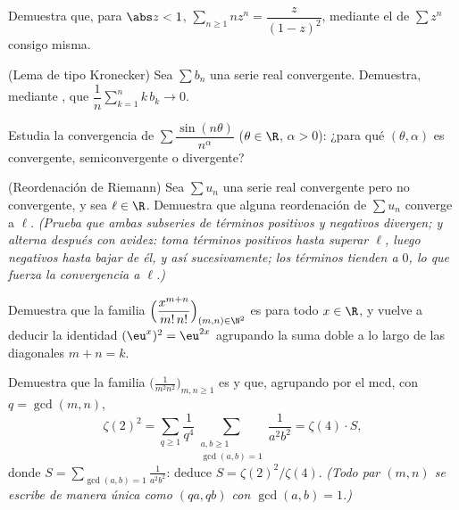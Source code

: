 \begin{exercise}[$\star$]\label{exo:b2:series:2}
Demuestra que, para $\abs z < 1$, $\sum_{n\geq1} n z^{n} =
\dfrac{z}{(1-z)^2}$, mediante el  de $\sum z^n$
consigo misma.
\end{exercise}

\begin{exercise}[$\star\star$]\label{exo:b2:series:3}
(Lema de tipo Kronecker) Sea $\sum b_n$ una serie real convergente.
Demuestra, mediante , que $\dfrac{1}{n}\sum_{k=1}^{n}
k\,b_k \to 0$.
\end{exercise}

\begin{exercise}[$\star\star$]\label{exo:b2:series:4}
Estudia la convergencia de $\sum \dfrac{\sin(n\theta)}{n^\alpha}$
($\theta \in \R$, $\alpha > 0$): ¿para qué $(\theta, \alpha)$ es
 convergente, semiconvergente o divergente?
\end{exercise}

\begin{exercise}[$\star\star\star$]\label{exo:b2:series:5}
(Reordenación de Riemann) Sea $\sum u_n$ una serie real convergente
pero no  convergente, y sea $\ell \in \R$. Demuestra que
alguna reordenación de $\sum u_n$ converge a $\ell$. \emph{(Prueba
que ambas subseries de términos positivos y negativos divergen; y
alterna después con avidez: toma términos positivos hasta superar
$\ell$, luego negativos hasta bajar de él, y así sucesivamente; los
términos tienden a $0$, lo que fuerza la convergencia a $\ell$.)}
\end{exercise}

\begin{exercise}[$\star\star$]\label{exo:b2:series:6}
Demuestra que la familia
$\Bigl(\dfrac{x^{m+n}}{m!\,n!}\Bigr)_{(m,n)\in\N^2}$ es 
para todo $x \in \R$, y vuelve a deducir la identidad $(\eu^x)^2 =
\eu^{2x}$ agrupando la suma doble a lo largo de las diagonales $m +
n = k$.
\end{exercise}

\begin{exercise}[$\star\star$]\label{exo:b2:series:7}
Demuestra que la familia $\bigl(\frac{1}{m^2 n^2}\bigr)_{m,n \geq
1}$ es  y que, agrupando por el mcd, con $q = \gcd(m,n)$,
\[
\zeta(2)^2 = \sum_{q\geq1} \frac{1}{q^4}
\sum_{\substack{a,b \geq 1\\ \gcd(a,b)=1}} \frac{1}{a^2b^2}
= \zeta(4) \cdot S,
\]
donde $S = \sum_{\gcd(a,b)=1} \frac{1}{a^2b^2}$: deduce $S =
\zeta(2)^2/\zeta(4)$. \emph{(Todo par $(m,n)$ se escribe de manera
única como $(qa, qb)$ con $\gcd(a,b) = 1$.)}
\end{exercise}

